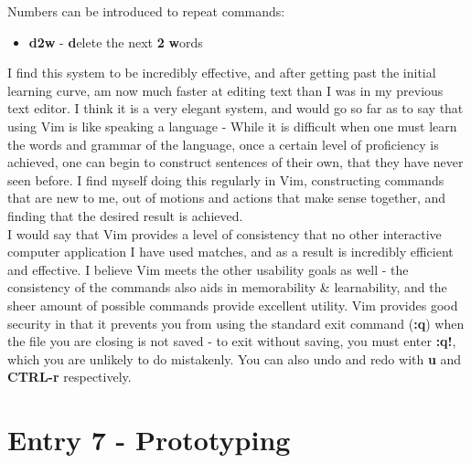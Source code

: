 \documentclass{article}
\begin{document}
Numbers can be introduced to repeat commands:
\begin{itemize}
    \item \textbf{d2w} - \textbf{d}elete the next \textbf{2} \textbf{w}ords
\end{itemize}
I find this system to be incredibly effective, and after getting past the initial learning curve, am now much faster at editing text than I was in my previous text editor. I think it is a very elegant system, and would go so far as to say that using Vim is like speaking a language - While it is difficult when one must learn the words and grammar of the language, once a certain level of proficiency is achieved, one can begin to construct sentences of their own, that they have never seen before. I find myself doing this regularly in Vim, constructing commands that are new to me, out of motions and actions that make sense together, and finding that the desired result is achieved.
\\\indent I would say that Vim provides a level of consistency that no other interactive computer application I have used matches, and as a result is incredibly efficient and effective. I believe Vim meets the other usability goals as well - the consistency of the commands also aids in memorability \& learnability, and the sheer amount of possible commands provide excellent utility. Vim provides good security in that it prevents you from using the standard exit command (\textbf{:q}) when the file you are closing is not saved - to exit without saving, you must enter \textbf{:q!}, which you are unlikely to do mistakenly. You can also undo and redo with \textbf{u} and \textbf{CTRL-r} respectively.

\section*{Entry 7 - Prototyping}
\end{document}
